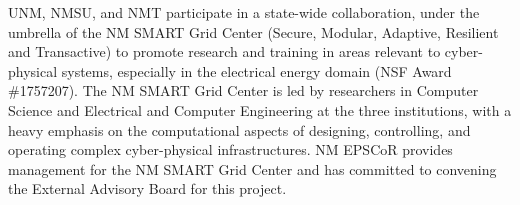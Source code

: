 UNM, NMSU, and NMT participate in a state-wide collaboration, under the umbrella of the NM SMART Grid Center (Secure, Modular, Adaptive, Resilient and Transactive) to promote research and training in areas relevant to cyber-physical systems, especially in the electrical energy domain (NSF Award \#1757207). The NM SMART Grid Center is led by researchers in Computer Science and Electrical and Computer Engineering at the three institutions, with a heavy emphasis on the computational aspects of designing, controlling, and operating complex cyber-physical infrastructures. NM EPSCoR provides management for the NM SMART Grid Center and has committed to convening the External Advisory Board for this project.
